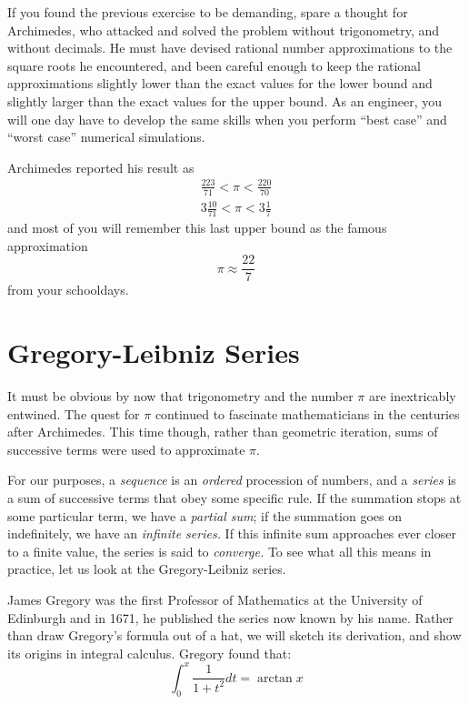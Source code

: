 \documentclass[11pt,a4paper,onecolumn]{article}
\begin{document}
If you found the previous exercise to be demanding, spare a thought for
Archimedes, who attacked and solved the problem without trigonometry,
and without decimals.  He must have devised rational number
approximations to the square roots he encountered, and been careful
enough to keep the rational approximations slightly lower than the
exact values for the lower bound and slightly larger than the exact
values for the upper bound.  As an engineer, you will one day have to
develop the same skills when you perform ``best case'' and ``worst
case'' numerical simulations.

Archimedes reported his result as%
%
\begin{equation}
\begin{array}{c}
\frac{223}{71} < \pi < \frac{220}{70}\\[0.5em]
3\frac{10}{71} < \pi < 3\frac{1}{7}
\end{array}
\end{equation}
%
and most of you will remember this last upper bound as the famous approximation %
\begin{equation}
\pi \approx \frac{22}{7}
\end{equation}
%
from your schooldays.

\section{Gregory-Leibniz Series}\label{sec:gregleib}

It must be obvious by now that trigonometry and the number $\pi$ are
inextricably entwined.  The quest for $\pi$ continued to fascinate
mathematicians in the centuries after Archimedes.  This time though,
rather than geometric iteration, sums of successive terms were used to
approximate $\pi$.

For our purposes, a \emph{sequence} is an \emph{ordered} procession of
numbers, and a \emph{series} is a sum of successive terms that obey
some specific rule.  If the summation stops at some particular term, we
have a \emph{partial sum}; if the summation goes on indefinitely, we
have an \emph{infinite series.}  If this infinite sum approaches ever
closer to a finite value, the series is said to \emph{converge.}  To
see what all this means in practice, let us look at the Gregory-Leibniz
series.

James Gregory was the first Professor of Mathematics at the University
of Edinburgh and in 1671, he published the series now known by his
name.  Rather than draw Gregory's formula out of a hat, we will sketch its derivation, and show its origins in integral calculus.  Gregory found that: %
%
\begin{equation}
\int_{0}^{x}\frac{1}{1+ t^2}dt = \arctan{x}
\label{eqn:invtan}
\end{equation}
\end{document}
